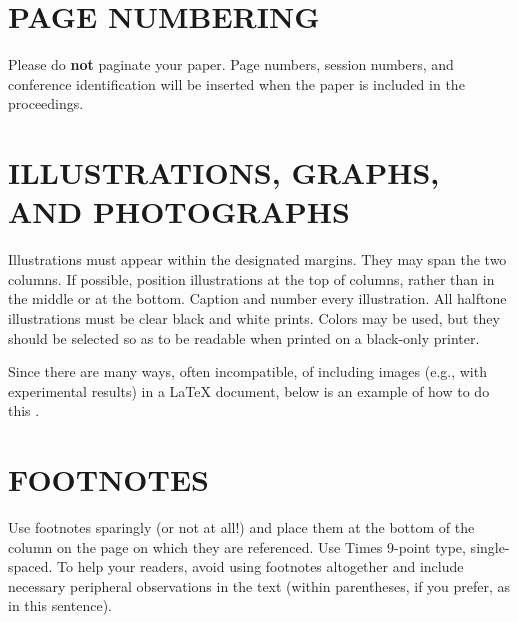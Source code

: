 \documentclass{article}
\begin{document}
\section{PAGE NUMBERING}
\label{sec:page}

Please do {\bf not} paginate your paper.  Page numbers, session numbers, and
conference identification will be inserted when the paper is included in the
proceedings.

\section{ILLUSTRATIONS, GRAPHS, AND PHOTOGRAPHS}
\label{sec:illust}

Illustrations must appear within the designated margins.  They may span the two
columns.  If possible, position illustrations at the top of columns, rather
than in the middle or at the bottom.  Caption and number every illustration.
All halftone illustrations must be clear black and white prints.  Colors may be
used, but they should be selected so as to be readable when printed on a
black-only printer.

Since there are many ways, often incompatible, of including images (e.g., with
experimental results) in a LaTeX document, below is an example of how to do
this \cite{Lamp86}.

\section{FOOTNOTES}
\label{sec:foot}

Use footnotes sparingly (or not at all!) and place them at the bottom of the
column on the page on which they are referenced. Use Times 9-point type,
single-spaced. To help your readers, avoid using footnotes altogether and
include necessary peripheral observations in the text (within parentheses, if
you prefer, as in this sentence).
\end{document}
